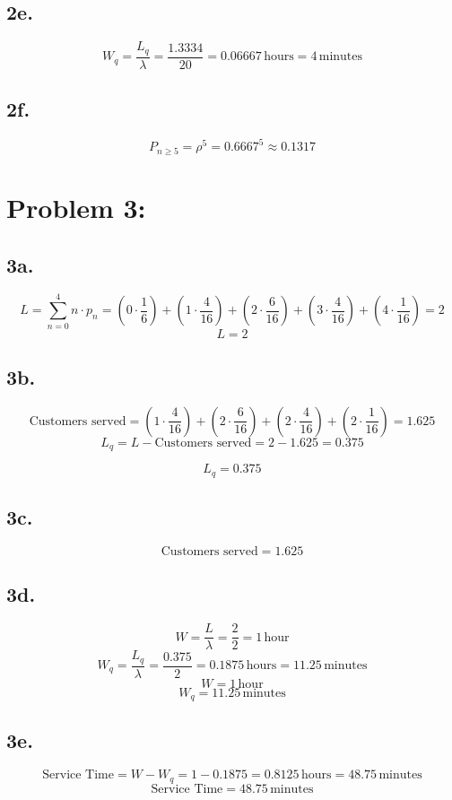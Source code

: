 \documentclass[12pt]{article}
\begin{document}
\subsection*{2e.}
\[
W_q = \frac{L_q}{\lambda} = \frac{1.3334}{20} = 0.06667 \, \text{hours} = 4 \, \text{minutes}
\]

\subsection*{2f.}
\[
P_{n \geq 5} = \rho^5 = 0.6667^5 \approx 0.1317
\]

\section*{Problem 3:}

\subsection*{3a.}
\[
L = \sum_{n=0}^{4} n \cdot p_n = (0 \cdot \frac{1}{6}) + (1 \cdot \frac{4}{16}) + (2 \cdot \frac{6}{16}) + (3 \cdot \frac{4}{16}) + (4 \cdot \frac{1}{16}) = 2
\]
\[
L = 2
\]

\subsection*{3b.}
\[
\text{Customers served} = (1 \cdot \frac{4}{16}) + (2 \cdot \frac{6}{16}) + (2 \cdot \frac{4}{16}) + (2 \cdot \frac{1}{16}) = 1.625
\]
\[
L_q = L - \text{Customers served} = 2 - 1.625 = 0.375
\]

\[
L_q = 0.375
\]

\subsection*{3c.}
\[
\text{Customers served} = 1.625
\]

\subsection*{3d.}
\[
W = \frac{L}{\lambda} = \frac{2}{2} = 1 \, \text{hour}
\]
\[
W_q = \frac{L_q}{\lambda} = \frac{0.375}{2} = 0.1875 \, \text{hours} = 11.25 \, \text{minutes}
\]
\[
W = 1 \, \text{hour}
\]
\[
W_q = 11.25 \, \text{minutes}
\]

\subsection*{3e.}
\[
\text{Service Time} = W - W_q = 1 - 0.1875 = 0.8125 \, \text{hours} = 48.75 \, \text{minutes}
\]
\[
\text{Service Time} = 48.75 \, \text{minutes}
\]
\end{document}

